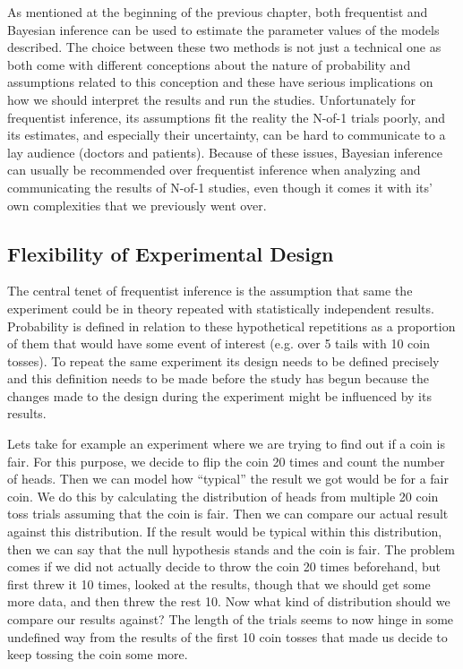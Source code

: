 \documentclass[12pt,a4paper,leqno]{report}
\theoremstyle{plain}
\theoremstyle{definition}
\theoremstyle{remark}
\begin{document}
As mentioned at the beginning of the previous chapter, both frequentist and
Bayesian inference can be used to estimate the parameter values of the models
described. The choice between these two methods is not just a technical one as both come
with different conceptions about the nature of probability and assumptions
related to this conception and these have serious implications on how we should
interpret the results and run the studies. Unfortunately for frequentist inference, its
assumptions fit the reality the N-of-1 trials poorly, and its estimates, and
especially their uncertainty, can be hard to communicate to a lay audience (doctors and patients).
Because of these issues, Bayesian inference can usually be recommended over
frequentist inference when analyzing and communicating the results of N-of-1
studies, even though it comes it with its' own complexities that we previously went over.

\subsection{Flexibility of Experimental Design}\label{whybayes}

The central tenet of frequentist inference is the assumption that same the
experiment could be in theory repeated with statistically independent results. Probability
is defined in relation to these hypothetical repetitions as a proportion of them
that would have some event of interest (e.g. over 5 tails with 10 coin tosses). To repeat the same experiment its design
needs to be defined precisely and this definition needs to be made before the
study has begun because the changes made to the design during the experiment
might be influenced by its results.

Lets take for example an experiment where we are trying to find out if a coin
is fair. For this purpose, we decide to flip the coin 20 times and count the number
of heads. Then we can model how ``typical'' the result we got would be for a fair coin. We do
this by calculating the distribution of heads from multiple 20 coin toss trials
assuming that the coin is fair. Then we can compare our actual result against this
distribution. If the result would be typical within this distribution, then we
can say that the null hypothesis stands and the coin is fair. The problem comes if we did
not actually decide to throw the coin 20 times beforehand, but first threw it 10 times, looked at
the results, though that we should get some more data, and then threw the rest 10. Now what
kind of distribution should we compare our results against? The length of the trials
seems to now hinge in some undefined way from the results of the first 10 coin tosses
that made us decide to keep tossing the coin some more.
\end{document}
